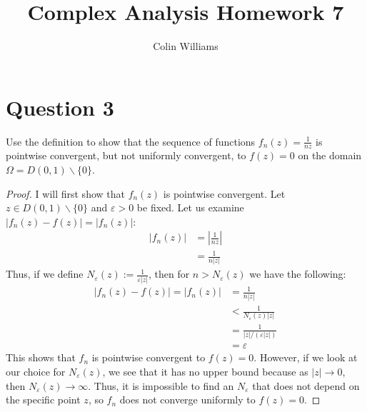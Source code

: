 \documentclass[10pt,a4paper]{article}
\title{Complex Analysis Homework 7}
\author{Colin Williams}
\theoremstyle{definition}
\begin{document}
\maketitle

\section*{Question 3}
Use the definition to show that the sequence of functions $\displaystyle f_n(z) = \frac{1}{nz}$ is pointwise convergent, but not uniformly convergent, to $f(z) = 0$ on the domain $\Omega = D(0,1)\backslash \{0\}$.

\begin{proof}
I will first show that $f_n(z)$ is pointwise convergent. Let $z \in D(0,1) \backslash \{0\}$ and $\varepsilon > 0$ be fixed. Let us examine $|f_n(z) - f(z)| = |f_n(z)|$:
\begin{align*}
|f_n(z)| &= \left|\frac{1}{nz}\right|\\
&= \frac{1}{n|z|}
\end{align*}
Thus, if we define $N_{\varepsilon}(z) := \frac{1}{\varepsilon |z|}$, then for $n > N_{\varepsilon}(z)$ we have the following:
\begin{align*}
|f_n(z) - f(z)| = |f_n(z)| &= \frac{1}{n|z|}\\
&< \frac{1}{N_{\varepsilon}(z)|z|}\\
&= \frac{1}{|z|/(\varepsilon |z|)}\\
&= \varepsilon
\end{align*}
This shows that $f_n$ is pointwise convergent to $f(z) = 0$. However, if we look at our choice for $N_{\varepsilon}(z)$, we see that it has no upper bound because as $|z| \to 0$, then $N_{\varepsilon}(z) \to \infty$. Thus, it is impossible to find an $N_{\varepsilon}$ that does not depend on the specific point $z$, so $f_n$ does not converge uniformly to $f(z) = 0$.
\end{proof}
\end{document}
